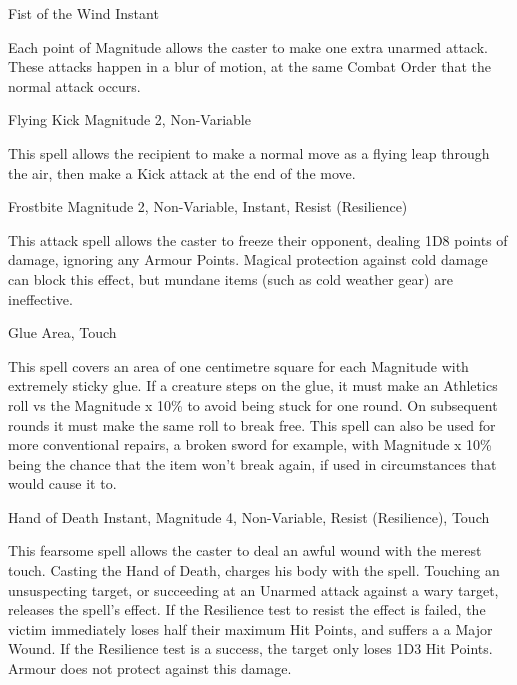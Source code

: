 \begin{rpg-spell}
{Fist of the Wind}
{Instant}

Each point of Magnitude allows the caster to make one extra unarmed attack. These attacks happen in a blur of motion, at the same Combat Order that the normal attack occurs.
\end{rpg-spell}


\begin{rpg-spell}
{Flying Kick}
{Magnitude 2, Non-Variable}

This spell allows the recipient to make a normal move as a flying leap through the air, then make a Kick attack at the end of the move.
\end{rpg-spell}



\begin{rpg-spell}
{Frostbite}
{Magnitude 2, Non-Variable, Instant, Resist (Resilience)}

This attack spell allows the caster to freeze their opponent, dealing 1D8 points of damage, ignoring any Armour Points. Magical protection against cold damage can block this effect, but mundane items (such as cold weather gear) are ineffective.
\end{rpg-spell}


\begin{rpg-spell}
{Glue}
{Area, Touch}

This spell covers an area of one centimetre square for each Magnitude with extremely sticky glue. If a creature steps on the glue, it must make an Athletics roll vs the Magnitude x 10\% to avoid being stuck for one round. On subsequent rounds it must make the same roll to break free. This spell can also be used for more conventional repairs, a broken sword for example, with Magnitude x 10\% being the chance that the item won’t break again, if used in circumstances that would cause it to.
\end{rpg-spell}


\begin{rpg-spell}
{Hand of Death}
{Instant, Magnitude 4, Non-Variable, Resist (Resilience), Touch}

This fearsome spell allows the caster to deal an awful wound with the merest touch. Casting the Hand of Death, charges his body with the spell. Touching an unsuspecting target, or succeeding at an Unarmed attack against a wary target, releases the spell’s effect. If the Resilience test to resist the effect is failed, the victim immediately loses half their maximum Hit Points, and suffers a a Major Wound. If the Resilience test is a success, the target only loses 1D3 Hit Points. Armour does not protect against this damage.
\end{rpg-spell}


